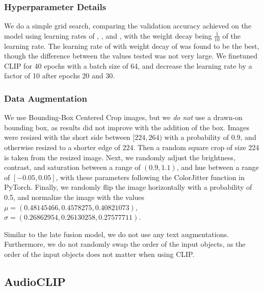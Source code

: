 \documentclass[runningheads]{llncs}
\begin{document}
\subsubsection{Hyperparameter Details} We do a simple grid search, comparing the validation accuracy achieved on the model using learning rates of , , and , with the weight decay being $\frac{1}{10}$ of the learning rate. The learning rate of  with weight decay of  was found to be the best, though the difference between the values tested was not very large. We finetuned CLIP for 40 epochs with a batch size of 64, and decrease the learning rate by a factor of 10 after epochs 20 and 30. 

\subsubsection{Data Augmentation}

We use Bounding-Box Centered Crop images, but we \textit{do not} use a drawn-on bounding box, as results did not improve with the addition of the box. Images were resized with the short side between $[224, 264)$ with a probability of 0.9, and otherwise resized to a shorter edge of $224$. Then a random square crop of size 224 is taken from the resized image. Next, we randomly adjust the brightness, contrast, and saturation between a range of $(0.9, 1.1)$, and hue between a range of $[-0.05, 0.05]$, with these parameters following the ColorJitter function in PyTorch. Finally, we randomly flip the image horizontally with a probability of 0.5, and normalize the image with the values $\mu = (0.48145466, 0.4578275, 0.40821073)$, $\sigma = (0.26862954, 0.26130258, 0.27577711)$.

Similar to the late fusion model, we do not use any text augmentations. Furthermore, we do not randomly swap the order of the input objects, as the order of the input objects does not matter when using CLIP. 

\subsection{AudioCLIP~\cite{guzhov2021audioclip}}
\end{document}
